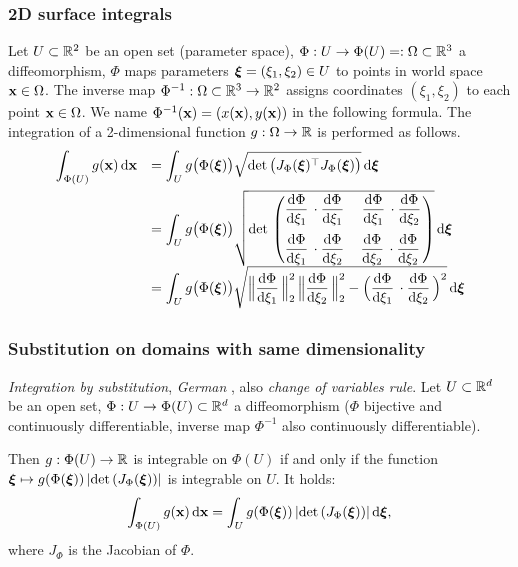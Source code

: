 \subsubsection{2D surface integrals}
Let $U \subset \mathbb{R}^2$ be an open set (parameter space), $\Phi:U \to \Phi(U)=:\Omega \subset\mathbb{R}^3$ a diffeomorphism, $\Phi$ maps parameters $\boldsymbol{\xi}=(\xi_1,\xi_2) \in U$ to points in world space $\textbf{x} \in \Omega$. The inverse map $\Phi^{-1} : \Omega \subset \mathbb{R}^3 \to \mathbb{R}^2$ assigns coordinates $(\xi_1,\xi_2)$ to each point $\textbf{x}\in\Omega$. We name $\Phi^{-1}(\textbf{x}) = (x(\textbf{x}),y(\textbf{x}))$ in the following formula. The integration of a 2-dimensional function $g:\Omega \to \mathbb{R}$ is performed as follows.
%
\begin{equation}\label{eq:integration_transformation_2d}
  \begin{array}{ll}
    \ds\int_{\Phi(U)} g(\bfx) \,\d\bfx  
    &  = \ds\int_{U} g\big(\Phi(\bfxi)\big) 
    \sqrt{\det \big(J_{\Phi}(\bfxi)^\top J_{\Phi}(\bfxi)\big)}\,\d\bfxi\\[4mm]
    
    & = \ds\int_{U} g\big(\Phi(\bfxi)\big) 
    \sqrt{\det\mat{\d{\Phi}{\xi_1} \cdot \d{\Phi}{\xi_1} & \d{\Phi}{\xi_1} \cdot \d{\Phi}{\xi_2}  \\[4mm]
    \d{\Phi}{\xi_1} \cdot \d{\Phi}{\xi_2} & \d{\Phi}{\xi_2} \cdot \d{\Phi}{\xi_2}}}\,\d\bfxi\\[4mm]
    
     & = \ds\int_{U} g\big(\Phi(\bfxi)\big) 
    \sqrt{\Big\Vert \d{\Phi}{\xi_1}\Big\Vert_2^2\,\Big\Vert \d{\Phi}{\xi_2}\Big\Vert_2^2 - \Big(\d{\Phi}{\xi_1} \cdot \d{\Phi}{\xi_2}\Big)^2 }\,\d\bfxi\\[4mm]
    
    
  \end{array}
\end{equation}

\subsubsection{Substitution on domains with same dimensionality}
\emph{Integration by substitution}, \textit{German }, also \emph{change of variables rule}.
Let $U \subset \mathbb{R}^d$ be an open set, $\Phi:U \to \Phi(U) \subset\mathbb{R}^d$ a diffeomorphism ($\Phi$ bijective and continuously differentiable, inverse map $\Phi^{-1}$ also continuously differentiable).

Then $g:\Phi(U) \to \mathbb{R}$ is integrable on $\Phi(U)$ if and only if the function $\boldsymbol{\xi} \mapsto g(\Phi(\boldsymbol{\xi}))\,|\hbox{det} \,(J_{\Phi}(\boldsymbol{\xi}))|$ is integrable on $U$. It holds:
\begin{equation}\label{eq:integration_transformation_3d}
  \begin{array}{ll}
    \ds\int_{\Phi(U)} g(\bfx)\,\d \bfx = \ds\int_U g(\Phi(\bfxi))\,|\det(J_{\Phi}(\bfxi))|\,\d \bfxi,
  \end{array}
\end{equation}
where $J_{\Phi}$ is the Jacobian of $\Phi$.


